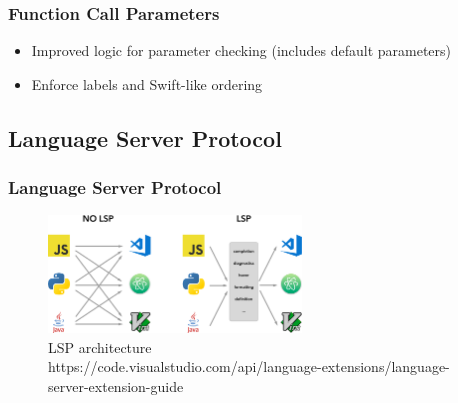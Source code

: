 \documentclass[aspectratio=169]{beamer}
\begin{document}
\begin{frame}
\frametitle{Function Call Parameters}
\begin{itemize}
    \item Improved logic for parameter checking (includes default parameters)
    \item Enforce labels and Swift-like ordering
\end{itemize}
\end{frame}

\subsection{Language Server Protocol}

\begin{frame}
\frametitle{Language Server Protocol}
\begin{figure}
    \centering
    \includegraphics[width=0.6\textwidth]{figures/lsp.png}
    \caption* {LSP architecture \\ \tiny {https://code.visualstudio.com/api/language-extensions/language-server-extension-guide}}
\end{figure}
\end{frame}
\end{document}
